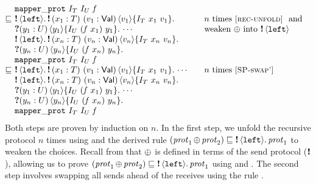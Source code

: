 \[
\begin{array}[t]{@{} l @{\ } l @{} @{\qquad} l}
&\mapperprotname\ \interpvar_\tvar\ \interpvar_\tvarB\ \mapvar \\
\subprotop
&
  \begin{array}[t]{@{} l @{}}
    \sendprotT{}{\leftname}
    \sendprot{(\var_1 : \tvar)\ (\val_1 : \Val)}
      {\val_1}
      {\interpvar_\tvar\ \var_1\ \val_1} \\
    \recvprot{(\varB_1 : \tvarB)}{\varB_1}
      {\interpvar_{\tvarB}\ {(\mapvar\ \var_1)}\ \varB_1}
    \cdots\\
    \sendprotT{}{\leftname}
    \sendprot{(\var_n : \tvar)\ (\val_n : \Val)}
      {\val_n}
      {\interpvar_\tvar\ \var_n\ \val_n}\\
    \recvprot{(\varB_n : \tvarB)}{\varB_n}
      {\interpvar_{\tvarB}\ {(\mapvar\ \var_n)}\ \varB_n}
    \\
    \mapperprotname\ \interpvar_\tvar\ \interpvar_\tvarB\ \mapvar
  \end{array} &
  \begin{array}[t]{@{} l}
  \textnormal{$n$ times \ruleref{rec-unfold} and}\\
  \textnormal{weaken $\selectop$ into $\genprotTHead{\SEND}{}{\leftname}$}
  \end{array} \\
\subprotop
&
  \begin{array}[t]{@{} l @{}}
    \sendprotT{}{\leftname}
    \sendprot{(\var_1 : \tvar)\ (\val_1 : \Val)}
      {\val_1}
      {\interpvar_\tvar\ \var_1\ \val_1}
      \cdots\\
    \sendprotT{}{\leftname}
    \sendprot{(\var_n : \tvar)\ (\val_n : \Val)}
      {\val_n}
      {\interpvar_\tvar\ \var_n\ \val_n}\\
    \recvprot{(\varB_1 : \tvarB)}{\varB_1}
      {\interpvar_{\tvarB}\ {(\mapvar\ \var_1)}\ \varB_1}
      \cdots\\
    \recvprot{(\varB_n : \tvarB)}{\varB_n}
     {\interpvar_{\tvarB}\ {(\mapvar\ \var_n)}\ \varB_n}
    \\
    \mapperprotname\ \interpvar_\tvar\ \interpvar_\tvarB\ \mapvar
  \end{array} & \textnormal{$n$ times \ruleref{SP-swap'}}
\end{array}
\]
Both steps are proven by induction on $n$.
In the first step, we unfold the recursive protocol $n$ times using
 and the derived rule
$\subprot {(\prot_1 \selectop \prot_2)} {\sendprotT{}{\leftname}{\prot_1}}$
to weaken the choices.
Recall from  that $\mathop{\oplus}$
is defined in terms of the send protocol ($\textnormal{\bf !}$), allowing us to prove
$\subprot {(\prot_1 \selectop \prot_2)} {\sendprotT{}{\leftname}{\prot_1}}$
using  and .
The second step involves swapping all sends ahead of the receives using the rule
.


